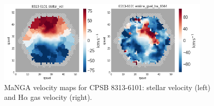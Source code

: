 \begin{figure}
    \centering
    \includegraphics[width=0.9\textwidth]{images/VelocityMaps/CPSB-8313-6101-VMAPS.png}
    \caption[MaNGA velocity maps for CPSB 8313-6101]{MaNGA velocity maps for CPSB 8313-6101: stellar velocity (left) and H$\alpha$ gas velocity (right).}
    \label{fig:CPSB-8313-6101-VMAPS}
\end{figure}



